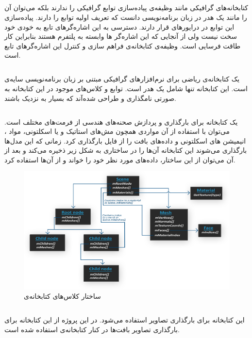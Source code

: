 \subsection{}
کتابخانه‌های گرافیکی مانند
وظیفه‌‌ی پیاده‌سازی توابع گرافیکی را ندارند بلکه می‌توان آن را مانند یک هدر در زبان 
برنامه‌نویسی 
دانست که تعریف اولیه توابع را دارند. پیاده‌سازی این توابع در درایور‌های 
قرار دارند.
دسترسی به این اشاره‌گر‌‌های تابع به خودی خود سخت نیست ولی از آنجایی که این اشاره‌گر ها وابسته به پلتفرم هستند بنابراین کار طاقت فرسایی است. 
وظیفه‌ی کتابخانه‌ی 
فراهم سازی و کنترل این اشاره‌گرهای تابع است.
\cite{GLAD}


\subsection{}
یک کتابخانه‌ی ریاضی برای نرم‌افزارهای گرافیکی مبتنی بر زبان برنامه‌نویسی سایه‌ی 
است. این کتابخانه تنها شامل یک هدر 
است.
توابع و کلاس‌های موجود در این کتابخانه به صورتی نامگذاری و طراحی شده‌آند که بسیار به 
 نزدیک باشند.


 \subsection{}

 یک کتابخانه برای بارگذاری و پردازش صحنه‌های هندسی از فرمت‌های مختلف است.
 می‌توان با استفاده از آن مواردی همچون مش‌های استاتیک و یا اسکلتونی، مواد 
 ، انیمیشن های اسکلتونی و داده‌‌های بافت را از فایل بارگذاری کرد.
زمانی که این مدل‌ها بارگذاری می‌شوند این کتابخانه آن‌ها را در ساختاری به شکل زیر ذخیره می‌کند و بعد از آن می‌توان از این ساختار، داده‌های مورد نظر خود را خواند و از آن‌ها استفاده کرد.
\cite{Assimp} \cite{LearnOpenGL_Assimp}

\begin{figure}[ht]
	\centerline{\includegraphics[width=\textwidth,height=\textheight,keepaspectratio]{Figures/Ch5/assimp_structure.png}}

	\caption{ساختار کلاس‌های کتابخانه‌ی  \cite{LearnOpenGL_Assimp}}
	\label{fig:Assimp}
  \end{figure}
  


  
\subsection{}

این کتابخانه برای بارگذاری تصاویر استفاده می‌شود. در این پروژه از این کتابخانه برای بارگذاری
تصاویر بافت‌ها در کنار کتابخانه‌ی 
استفاده شده است.
\cite{stb}